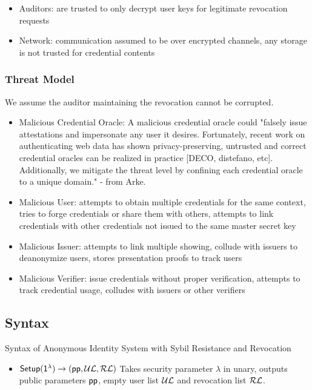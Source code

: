 {\begin{itemize}
    \item Auditors: are trusted to only decrypt user keys for legitimate revocation requests

    \item Network: communication assumed to be over encrypted channels, any storage is not trusted for credential contents
\end{itemize}

\subsubsection{Threat Model}
We assume the auditor maintaining the revocation cannot be corrupted.

\begin{itemize}
    \item Malicious Credential Oracle: A malicious credential oracle could "falsely issue attestations and impersonate any user it desires. Fortunately, recent work on authenticating web data has shown privacy-preserving, untrusted and correct credential oracles can be realized in practice [DECO, distefano, etc]. Additionally, we mitigate the threat level by confining each credential oracle to a unique domain." - from Arke. 
    \item Malicious User: attempts to obtain multiple credentials for the same context, tries to forge credentials or share them with others, attempts to link credentials with other credentials not issued to the same master secret key
    \item Malicious Issuer: attempts to link multiple showing, collude with issuers to deanonymize users, stores presentation proofs to track users
    \item Malicious Verifier: issue credentials without proper verification, attempts to track credential usage, colludes with issuers or other verifiers
\end{itemize}



\subsection{Syntax}

Syntax of Anonymous Identity System with Sybil Resistance and Revocation
\begin{itemize}
    \item $\mathsf{Setup}(\mathsf{1^{\lambda}}) \to (\mathsf{pp}, \mathcal{UL}, \mathcal{RL})$ Takes security parameter $\lambda$ in unary, outputs public parameters $\mathsf{pp}$, empty user list $\mathcal{UL}$ and revocation list $\mathcal{RL}$.


\end{itemize}}
